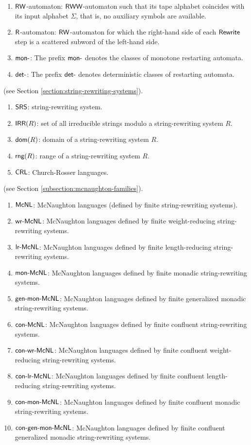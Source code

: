 \begin{enumerate}[]
\item $\textup{\sf RW}$-automaton: $\textup{\sf RWW}$-automaton such that its tape alphabet coincides with its input alphabet $\Sigma$, that is, no auxiliary symbols are available.
\item $\textup{\sf R}$-automaton: $\textup{\sf RW}$-automaton for which the right-hand side of each $\textup{\sf Rewrite}$ step is a scattered subword of the left-hand side.
\item $\textup{\sf mon-}$: The prefix $\textup{\sf mon-}$ denotes the classes of monotone restarting automata.
\item $\textup{\sf det-}$: The prefix $\textup{\sf det-}$ denotes deterministic classes of restarting automata.
\end{enumerate}

 (see Section \ref{section:string-rewriting-systems}).

\begin{enumerate}[]
\item $\textup{\sf SRS}$: string-rewriting system.
\item $\textup{\sf IRR}(R)$: set of all irreducible strings modulo a string-rewriting system $R$.
\item $\textup{\sf dom}(R)$: domain of a string-rewriting system $R$.
\item $\textup{\sf rng}(R)$: range of a string-rewriting system $R$.
\item $\textup{\sf CRL}$: Church-Rosser languages.
\end{enumerate}

 (see Section \ref{subsection:mcnaughton-families}).

\begin{enumerate}[]
\item ${\sf McNL}$: McNaughton languages (defined by finite string-rewriting systems).
\item $\textup{\sf wr-McNL}$: McNaughton languages defined by finite weight-reducing string-rewriting systems.
\item $\textup{\sf lr-McNL}$: McNaughton languages defined by finite length-reducing string-rewriting systems.
\item $\textup{\sf mon-McNL}$: McNaughton languages defined by finite monadic string-rewriting systems.
\item $\textup{\sf gen-mon-McNL}$: McNaughton languages defined by finite generalized monadic string-rewriting systems.
\item $\textup{\sf con-McNL}$: McNaughton languages defined by finite confluent string-rewriting systems.
\item $\textup{\sf con-wr-McNL}$: McNaughton languages defined by finite confluent weight-reducing string-rewriting systems.
\item $\textup{\sf con-lr-McNL}$: McNaughton languages defined by finite confluent length-reducing string-rewriting systems.
\item $\textup{\sf con-mon-McNL}$: McNaughton languages defined by finite confluent monadic string-rewriting systems.
\item $\textup{\sf con-gen-mon-McNL}$: McNaughton languages defined by finite confluent generalized monadic string-rewriting systems.
\end{enumerate}

